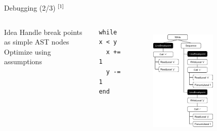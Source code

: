 \documentclass[xcolor=dvipsname,handout]{beamer}
\newcommand{\up}[1]{\ensuremath{^{{\tiny#1}}}}
\newcommand{\idea}[1]{$\rightarrow$ #1}
\begin{document}
\begin{frame}[fragile]{Debugging (2/3) \up{[1]}}
  \begin{columns}[T]
      \begin{block}{Idea}
        Handle break points as simple AST nodes \\ Optimize using assumptions
      \end{block}

      \begin{lstlisting}
while x < y
  x += 1
  y -= 1
end
      \end{lstlisting}

      \begin{figure}
        \centering
        \includegraphics[width=0.7\textwidth]{breakpoints-crop.pdf}
        \label{fig:breakpoints}
      \end{figure}
  \end{columns}






\end{frame}
\end{document}
